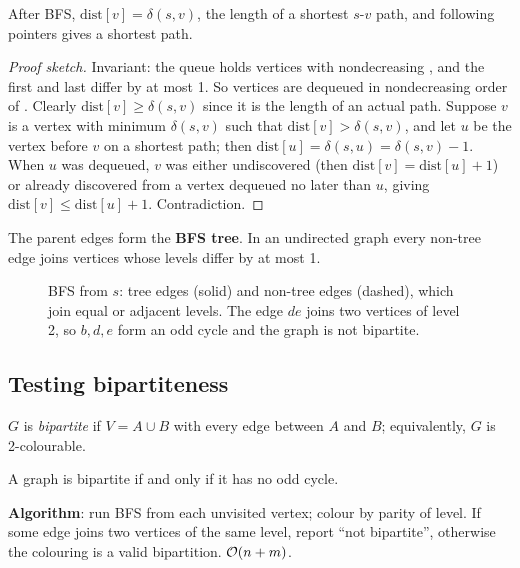 \begin{theorem}
After BFS, $\mathrm{dist}[v]=\delta(s,v)$, the length of a shortest $s$-$v$ path, and following  pointers gives a shortest path.
\end{theorem}
\begin{proof}[Proof sketch]
Invariant: the queue holds vertices with nondecreasing , and the first and last differ by at most 1.
So vertices are dequeued in nondecreasing order of . Clearly $\mathrm{dist}[v]\ge\delta(s,v)$ since it is the length of an
actual path. Suppose $v$ is a vertex with minimum $\delta(s,v)$ such that $\mathrm{dist}[v]>\delta(s,v)$, and let $u$ be the vertex before $v$
on a shortest path; then $\mathrm{dist}[u]=\delta(s,u)=\delta(s,v)-1$. When $u$ was dequeued, $v$ was either undiscovered (then
$\mathrm{dist}[v]=\mathrm{dist}[u]+1$) or already discovered from a vertex dequeued no later than $u$, giving $\mathrm{dist}[v]\le\mathrm{dist}[u]+1$. Contradiction.
\end{proof}

The parent edges form the \textbf{BFS tree}. In an undirected graph every non-tree edge joins vertices whose levels differ by at most 1.

\begin{figure}[H]
\centering
{}
\caption{BFS from $s$: tree edges (solid) and non-tree edges (dashed), which
join equal or adjacent levels. The edge $de$ joins two vertices of level 2,
so $b,d,e$ form an odd cycle and the graph is not bipartite.}
\end{figure}

\subsection{Testing bipartiteness}
$G$ is \emph{bipartite} if $V=A\cup B$ with every edge between $A$ and $B$; equivalently, $G$ is 2-colourable.
\begin{theorem}
A graph is bipartite if and only if it has no odd cycle.
\end{theorem}
\textbf{Algorithm}: run BFS from each unvisited vertex; colour by parity of level. If some edge joins two vertices of the same level,
report ``not bipartite'', otherwise the colouring is a valid bipartition. $\mathcal{O}(n+m)$.

